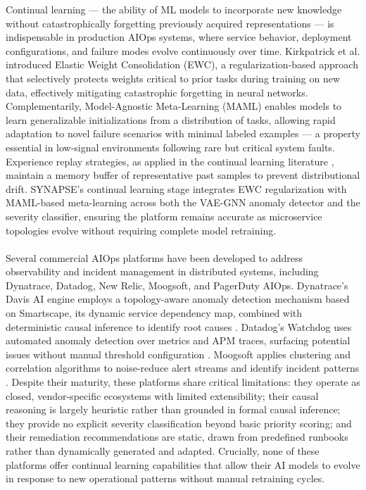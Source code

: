 \hspace*{0.3in} Continual learning — the ability of ML models to incorporate new knowledge without catastrophically forgetting previously acquired representations — is indispensable in production AIOps systems, where service behavior, deployment configurations, and failure modes evolve continuously over time. Kirkpatrick et al. \cite{kirkpatrick2017ewc} introduced Elastic Weight Consolidation (EWC), a regularization-based approach that selectively protects weights critical to prior tasks during training on new data, effectively mitigating catastrophic forgetting in neural networks. Complementarily, Model-Agnostic Meta-Learning (MAML) \cite{finn2017maml} enables models to learn generalizable initializations from a distribution of tasks, allowing rapid adaptation to novel failure scenarios with minimal labeled examples — a property essential in low-signal environments following rare but critical system faults. Experience replay strategies, as applied in the continual learning literature \cite{rolnick2019experience}, maintain a memory buffer of representative past samples to prevent distributional drift. SYNAPSE's continual learning stage integrates EWC regularization with MAML-based meta-learning across both the VAE-GNN anomaly detector and the severity classifier, ensuring the platform remains accurate as microservice topologies evolve without requiring complete model retraining.\\\\

\hspace*{0.3in} Several commercial AIOps platforms have been developed to address observability and incident management in distributed systems, including Dynatrace, Datadog, New Relic, Moogsoft, and PagerDuty AIOps. Dynatrace's Davis AI engine employs a topology-aware anomaly detection mechanism based on Smartscape, its dynamic service dependency map, combined with deterministic causal inference to identify root causes \cite{dynatrace2022davis}. Datadog's Watchdog uses automated anomaly detection over metrics and APM traces, surfacing potential issues without manual threshold configuration \cite{datadog2023watchdog}. Moogsoft applies clustering and correlation algorithms to noise-reduce alert streams and identify incident patterns \cite{moogsoft2021aiops}. Despite their maturity, these platforms share critical limitations: they operate as closed, vendor-specific ecosystems with limited extensibility; their causal reasoning is largely heuristic rather than grounded in formal causal inference; they provide no explicit severity classification beyond basic priority scoring; and their remediation recommendations are static, drawn from predefined runbooks rather than dynamically generated and adapted. Crucially, none of these platforms offer continual learning capabilities that allow their AI models to evolve in response to new operational patterns without manual retraining cycles.\\\\


